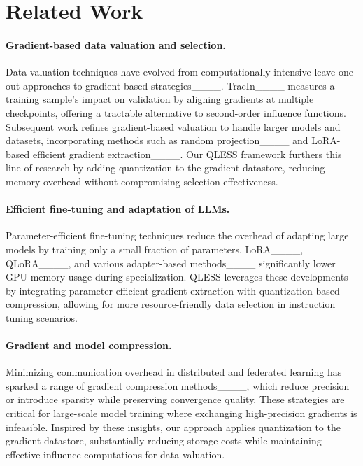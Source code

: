 \section{Related Work}
\label{sec:related_work}

\paragraph{Gradient-based data valuation and selection.}
Data valuation techniques have evolved from computationally intensive leave-one-out approaches to gradient-based strategies____. TracIn____ measures a training sample’s impact on validation by aligning gradients at multiple checkpoints, offering a tractable alternative to second-order influence functions. Subsequent work refines gradient-based valuation to handle larger models and datasets, incorporating methods such as random projection____ and LoRA-based efficient gradient extraction____. Our QLESS framework furthers this line of research by adding quantization to the gradient datastore, reducing memory overhead without compromising selection effectiveness.

\paragraph{Efficient fine-tuning and adaptation of LLMs.}
Parameter-efficient fine-tuning techniques reduce the overhead of adapting large models by training only a small fraction of parameters. LoRA____, QLoRA____, and various adapter-based methods____ significantly lower GPU memory usage during specialization. QLESS leverages these developments by integrating parameter-efficient gradient extraction with quantization-based compression, allowing for more resource-friendly data selection in instruction tuning scenarios.

\paragraph{Gradient and model compression.}
Minimizing communication overhead in distributed and federated learning has sparked a range of gradient compression methods____, which reduce precision or introduce sparsity while preserving convergence quality. These strategies are critical for large-scale model training where exchanging high-precision gradients is infeasible. Inspired by these insights, our approach applies quantization to the gradient datastore, substantially reducing storage costs while maintaining effective influence computations for data valuation.

